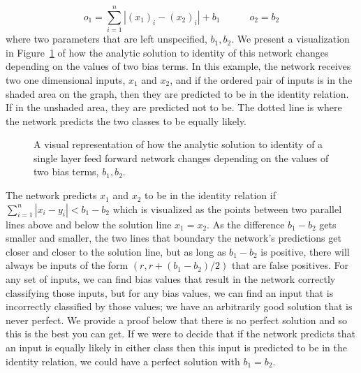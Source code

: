 \documentclass[12pt]{article}
\begin{document}
%
\[ o_1 = \sum_{i = 1}^{n}|(x_1)_i- (x_2)_i|+ b_1 \qquad \quad  o_2 = b_2\]
%
where two parameters that are left unspecified, $b_1, b_2$. We present a visualization in Figure~\ref{fig:analyticff} of how the analytic solution to identity of this network changes depending on the values of two bias terms. In this example, the network receives two one dimensional inputs, $x_1$ and $x_2$, and if the ordered pair of inputs is in the shaded area on the graph, then they are predicted to be in the identity relation. If in the unshaded area, they are predicted not to be. The dotted line is where the network predicts the two classes to be equally likely.


\begin{figure}[h]
  \centering
  \newcommand\X{2}
  \newcommand\E{0.03}
  \caption{A visual representation of how the analytic solution to identity of a single layer feed forward network changes depending on the values of two bias terms, $b_1,b_2$.}
  \label{fig:analyticff}
\end{figure}

The network predicts $x_1$ and $x_2$ to be in the identity relation if $\sum_{i = 1}^{n}|x_i- y_i| < b_1-b_2$ which is visualized as the points between two parallel lines above and below the solution line $x_1 = x_2$. As the difference $b_1-b_2$ gets smaller and smaller, the two lines that boundary the network's predictions get closer and closer to the solution line, but as long as $b_1-b_2$ is positive, there will always be inputs of the form $(r,r+(b_1-b_2)/2)$ that are false positives. For any set of inputs, we can find bias values that result in the network correctly classifying those inputs, but for any bias values, we can find an input that is incorrectly classified by those values; we have an arbitrarily good solution that is never perfect. We provide a proof below that there is no perfect solution and so this is the best you can get. If we were to decide that if the network predicts that an input is equally likely in either class then this input is predicted to be in the identity relation, we could have a perfect solution with $b_1= b_2$.
\end{document}
